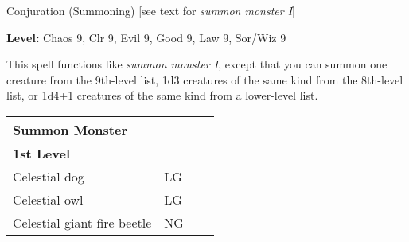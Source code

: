 
Conjuration (Summoning) [see text for \textit{summon monster I}]

\textbf{Level:} Chaos 9, Clr 9, Evil 9, Good 9, Law 9, Sor/Wiz 9

This spell functions like \textit{summon monster I}, except that you can summon 
one creature from the 9th-level list, 1d3 creatures of the same kind from the 8th-level 
list, or 1d4+1 creatures of the same kind from a lower-level list.

\begin{longtable}{llll}
\hline
\multicolumn{1}{|p{3.326in}|}{\begin{minipage}[t]{3.326in}\raggedright
\textbf{Summon Monster}\end{minipage}} & \multicolumn{1}{p{0.462in}|}{\begin{minipage}[t]{0.462in}\raggedright
\end{minipage}}\\
\hline
\multicolumn{1}{p{0.069in}|}{\begin{minipage}[t]{0.069in}\raggedright
\textbf{1st Level}\end{minipage}} & \multicolumn{1}{p{0.069in}|}{\begin{minipage}[t]{0.069in}\raggedright
\end{minipage}}\\
\hline
\multicolumn{1}{|p{3.326in}|}{\begin{minipage}[t]{3.326in}\raggedright
Celestial dog\end{minipage}} & \multicolumn{1}{p{0.462in}|}{\begin{minipage}[t]{0.462in}\raggedright
LG\end{minipage}}\\
\hline
\multicolumn{1}{p{0.069in}|}{\begin{minipage}[t]{0.069in}\raggedright
Celestial owl\end{minipage}} & \multicolumn{1}{p{0.069in}|}{\begin{minipage}[t]{0.069in}\raggedright
LG\end{minipage}}\\
\hline
\multicolumn{1}{|p{3.326in}|}{\begin{minipage}[t]{3.326in}\raggedright
Celestial giant fire beetle\end{minipage}} & \multicolumn{3}{p{0.601in}|}{\begin{minipage}[t]{0.601in}\raggedright
NG\end{minipage}}\\

\end{longtable}

